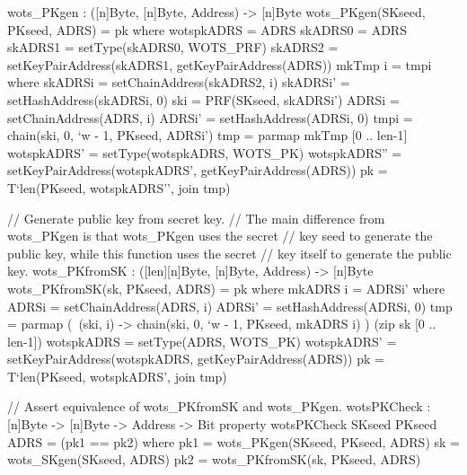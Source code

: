 \begin{code}
  wots_PKgen : ([n]Byte, [n]Byte, Address) -> [n]Byte
  wots_PKgen(SKseed, PKseed, ADRS) = pk where
    wotspkADRS = ADRS
    skADRS0 = ADRS
    skADRS1 = setType(skADRS0, WOTS_PRF)
    skADRS2 = setKeyPairAddress(skADRS1, getKeyPairAddress(ADRS))
    mkTmp i = tmpi where
      skADRSi = setChainAddress(skADRS2, i)
      skADRSi' = setHashAddress(skADRSi, 0)
      ski = PRF(SKseed, skADRSi')
      ADRSi = setChainAddress(ADRS, i)
      ADRSi' = setHashAddress(ADRSi, 0)
      tmpi = chain(ski, 0, `w - 1, PKseed, ADRSi')
    tmp = parmap mkTmp [0 .. len-1]
    wotspkADRS' = setType(wotspkADRS, WOTS_PK)
    wotspkADRS'' = setKeyPairAddress(wotspkADRS', getKeyPairAddress(ADRS))
    pk = T`{len}(PKseed, wotspkADRS'', join tmp)

  // Generate public key from secret key.
  // The main difference from wots_PKgen is that wots_PKgen uses the secret
  // key seed to generate the public key, while this function uses the secret
  // key itself to generate the public key.
  wots_PKfromSK : ([len][n]Byte, [n]Byte, Address) -> [n]Byte
  wots_PKfromSK(sk, PKseed, ADRS) = pk where
    mkADRS i = ADRSi' where
      ADRSi = setChainAddress(ADRS, i)
      ADRSi' = setHashAddress(ADRSi, 0)
    tmp = parmap (\ (ski, i) -> chain(ski, 0, `w - 1, PKseed, mkADRS i) )
                 (zip sk [0 .. len-1])
    wotspkADRS = setType(ADRS, WOTS_PK)
    wotspkADRS' = setKeyPairAddress(wotspkADRS, getKeyPairAddress(ADRS))
    pk = T`{len}(PKseed, wotspkADRS', join tmp)

  // Assert equivalence of wots_PKfromSK and wots_PKgen.
  wotsPKCheck : [n]Byte -> [n]Byte -> Address -> Bit
  property wotsPKCheck SKseed PKseed ADRS = (pk1 == pk2) where
    pk1 = wots_PKgen(SKseed, PKseed, ADRS)
    sk = wots_SKgen(SKseed, ADRS)
    pk2 = wots_PKfromSK(sk, PKseed, ADRS)
\end{code}

